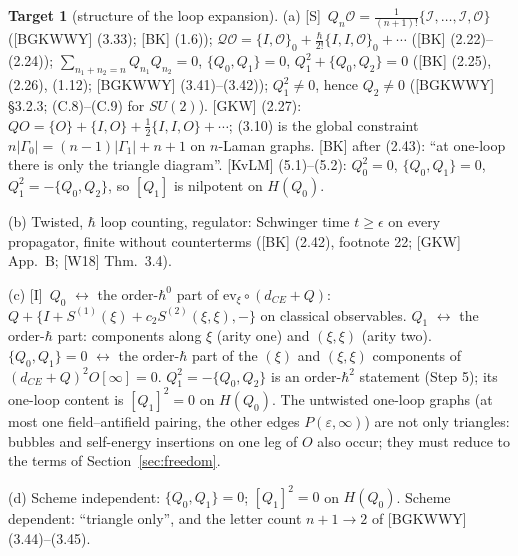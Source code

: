 \documentclass[11pt]{article}
\theoremstyle{definition}
\newtheorem{target}{Target}
\newcommand{\Sl}{\textup{[S]}}
\newcommand{\Il}{\textup{[I]}}
\begin{document}
\begin{target}[structure of the loop expansion]\label{t:structure}
(a) \Sl\ $Q_n\mathcal O=\frac1{(n+1)!}\{\mathcal I,\dots,\mathcal I,\mathcal O\}$ ([BGKWWY] (3.33); [BK] (1.6)); $\mathcal Q\mathcal O=\{I,\mathcal O\}_0+\frac{\hbar}{2!}\{I,I,\mathcal O\}_0+\cdots$ ([BK] (2.22)--(2.24)); $\sum_{n_1+n_2=n}Q_{n_1}Q_{n_2}=0$, $\{Q_0,Q_1\}=0$, $Q_1^2+\{Q_0,Q_2\}=0$ ([BK] (2.25), (2.26), (1.12); [BGKWWY] (3.41)--(3.42)); $Q_1^2\neq0$, hence $Q_2\neq0$ ([BGKWWY] \S3.2.3; (C.8)--(C.9) for $SU(2)$). [GKW] (2.27): $QO=\{O\}+\{I,O\}+\frac12\{I,I,O\}+\cdots$; (3.10) is the global constraint $n|\Gamma_0|=(n-1)|\Gamma_1|+n+1$ on $n$-Laman graphs. [BK] after (2.43): ``at one-loop there is only the triangle diagram''. [KvLM] (5.1)--(5.2): $Q_0^2=0$, $\{Q_0,Q_1\}=0$, $Q_1^2=-\{Q_0,Q_2\}$, so $[Q_1]$ is nilpotent on $H(Q_0)$.

(b) Twisted, $\hbar$ loop counting, regulator: Schwinger time $t\ge\epsilon$ on every propagator, finite without counterterms ([BK] (2.42), footnote 22; [GKW] App.~B; [W18] Thm.~3.4).

(c) \Il\ $Q_0$ $\leftrightarrow$ the order-$\hbar^0$ part of $\mathrm{ev}_\xi\circ(d_{CE}+Q)$: $Q+\{I+S^{(1)}(\xi)+c_2S^{(2)}(\xi,\xi),-\}$ on classical observables. $Q_1$ $\leftrightarrow$ the order-$\hbar$ part: components along $\xi$ (arity one) and $(\xi,\xi)$ (arity two). $\{Q_0,Q_1\}=0$ $\leftrightarrow$ the order-$\hbar$ part of the $(\xi)$ and $(\xi,\xi)$ components of $(d_{CE}+Q)^2O[\infty]=0$. $Q_1^2=-\{Q_0,Q_2\}$ is an order-$\hbar^2$ statement (Step 5); its one-loop content is $[Q_1]^2=0$ on $H(Q_0)$. The untwisted one-loop graphs (at most one field--antifield pairing, the other edges $P(\varepsilon,\infty)$) are not only triangles: bubbles and self-energy insertions on one leg of $O$ also occur; they must reduce to the terms of Section~\ref{sec:freedom}.

(d) Scheme independent: $\{Q_0,Q_1\}=0$; $[Q_1]^2=0$ on $H(Q_0)$. Scheme dependent: ``triangle only'', and the letter count $n+1\to2$ of [BGKWWY] (3.44)--(3.45).
\end{target}
\end{document}

